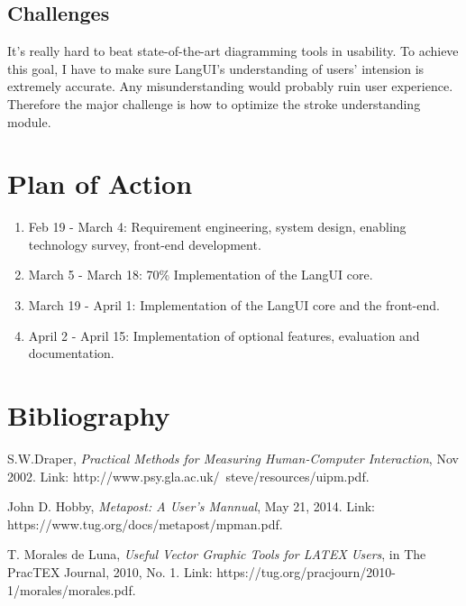 \documentclass[10pt,conference, twocolumn]{IEEEtran}
\begin{document}
\subsection{Challenges}
It's really hard to beat state-of-the-art diagramming tools in usability. To achieve this goal, I have to make sure LangUI's understanding of users' intension is extremely accurate. Any misunderstanding would probably ruin user experience. Therefore the major challenge is how to optimize the stroke understanding module.

\section{Plan of Action}

\begin{enumerate}
  \item Feb 19 - March 4: Requirement engineering, system design,  enabling technology survey, front-end development.
  \item March 5 - March 18: 70\% Implementation of the LangUI core.
  \item March 19 - April 1: Implementation of the LangUI core and the front-end.
  \item April 2 - April 15: Implementation of optional features, evaluation and documentation.
\end{enumerate}





\section{Bibliography}

\begin{thebibliography}{1}

 S.W.Draper, \emph{Practical Methods for Measuring Human-Computer Interaction}, Nov 2002. Link: http://www.psy.gla.ac.uk/~steve/resources/uipm.pdf.

John D. Hobby, \emph{Metapost: A User's Mannual}, May 21, 2014. Link: https://www.tug.org/docs/metapost/mpman.pdf.

T. Morales de Luna, \emph{Useful Vector Graphic Tools for LATEX Users}, in The PracTEX Journal, 2010, No. 1. Link: https://tug.org/pracjourn/2010-1/morales/morales.pdf.

\end{thebibliography}
\end{document}
